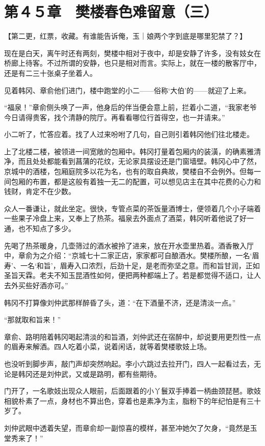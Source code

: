 \section{第４５章　樊楼春色难留意（三）}

【第二更，红票，收藏。有谁能告诉俺，玉｜娘两个字到底是哪里犯禁了？】

现在是白天，离午时还有两刻，樊楼中相对于夜中，却是安静了许多，没有妓女在桥廊上待客。不过所谓的安静，也只是相对而言。实际上，就在一楼的散客厅中，还是有二三十张桌子坐着人。

见着韩冈、章俞他们进门，楼中跑堂的小二——俗称‘大伯’的——就迎了上来。

“福泉！”章俞侧头唤了一声，他身后的伴当便会意上前，拦着小二道，“我家老爷今日请得贵客，找个清静的院厅。再看看哪位行首得空，也一并请来。”

小二听了，忙答应着。找了人过来吩咐了几句，自己则引着韩冈他们往北楼走。

上了北楼二楼，被领进一间宽敞的包厢中。韩冈打量着包厢内的装潢，的确素雅清净，而且处处都能看到菖蒲的花纹，无论家具摆设还是门窗墙壁。韩冈心中了然，京城中的酒楼，包厢庭院多以花为名，也有的取自典故，樊楼自不会例外。但每一间包厢的布置，都是这般有着独一无二的配置，可以想见店主在其中花费的心力和钱财，肯定不在少数。

众人一番谦让，就此坐定。很快，专管点菜的茶饭量酒博士，便领着几个小子端着一些果子冷盘上来，又奉上了热茶。福泉去外面点了酒菜，韩冈听着他说了好一通，也不知点了多少。

先喝了热茶暖身，几壶筛过的酒水被拎了进来，放在开水壶里热着。酒香散入厅中，章俞为之介绍：“京城七十二家正店，家家都可自酿酒水。樊楼所酿，一名‘眉寿’、一名‘和旨’，眉寿入口浓烈，后劲十足，是老而弥坚之意。而和旨甘润，正如圣旨天霖。老夫不知玉昆酒性如何，便把两种都端上了。若是都觉得不适口，让人去外买些好酒亦可。”

韩冈不打算像刘仲武那样醉昏了头，道：“在下酒量不济，还是清淡一点。”

“那就取和旨来！”

章俞、路明陪着韩冈喝起清淡的和旨酒，刘仲武还在宿醉中，却说要用更烈性一点的眉寿来解酒。四人吃着小菜，说着闲话，就等着樊楼歌妓上场。

也没听到脚步声，敲门声却突然响起。李小六跳过去拉开门，四人一起看过去，无论是韩冈还是刘仲武，又或是路明，都有些期待。

门开了，一名歌妓出现众人眼前，后面跟着的小丫鬟双手捧着一柄曲颈琵琶。歌妓相貌朴素了一点，身材也不算出色，穿着也是素净为主，脂粉下的年纪怕是有三十岁了。

刘仲武眼中透着失望，而章俞却一副惊喜的模样，甚至冲她欠了欠身，“竟然是玉堂秀来了！”

